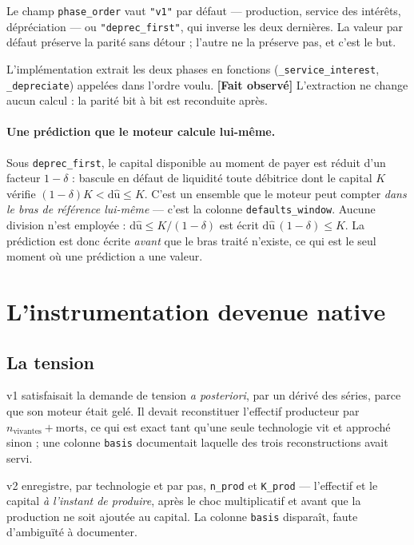 \documentclass[11pt,a4paper]{article}
\newcommand{\code}[1]{\texttt{#1}}
\newcommand{\fait}{\textbf{[Fait observé]}}
\begin{document}
Le champ \code{phase\_order} vaut \code{"v1"} par défaut --- production,
service des intérêts, dépréciation --- ou \code{"deprec\_first"}, qui inverse
les deux dernières. La valeur par défaut préserve la parité sans détour ;
l'autre ne la préserve pas, et c'est le but.

L'implémentation extrait les deux phases en fonctions
(\code{\_service\_interest}, \code{\_depreciate}) appelées dans l'ordre voulu.
\fait{} L'extraction ne change aucun calcul : la parité bit à bit est
reconduite après.

\paragraph{Une prédiction que le moteur calcule lui-même.} Sous
\code{deprec\_first}, le capital disponible au moment de payer est réduit d'un
facteur $1-\delta$ : bascule en défaut de liquidité toute débitrice dont le
capital $K$ vérifie $(1-\delta)K < \mathrm{d\hat u} \le K$. C'est un ensemble
que le moteur peut compter \emph{dans le bras de référence lui-même} --- c'est
la colonne \code{defaults\_window}. Aucune division n'est employée :
$\mathrm{d\hat u} \le K/(1-\delta)$ est écrit
$\mathrm{d\hat u}\,(1-\delta) \le K$. La prédiction est donc écrite \emph{avant}
que le bras traité n'existe, ce qui est le seul moment où une prédiction a une
valeur.

\section{L'instrumentation devenue native}
\label{sec:instrumentation}

\subsection{La tension}
\label{sec:tension-native}

v1 satisfaisait la demande de tension \emph{a posteriori}, par un dérivé des
séries, parce que son moteur était gelé. Il devait reconstituer l'effectif
producteur par $n_{\text{vivantes}} + \text{morts}$, ce qui est exact tant
qu'une seule technologie vit et approché sinon ; une colonne \code{basis}
documentait laquelle des trois reconstructions avait servi.

v2 enregistre, par technologie et par pas, \code{n\_prod} et \code{K\_prod} ---
l'effectif et le capital \emph{à l'instant de produire}, après le choc
multiplicatif et avant que la production ne soit ajoutée au capital. La colonne
\code{basis} disparaît, faute d'ambiguïté à documenter.
\end{document}
